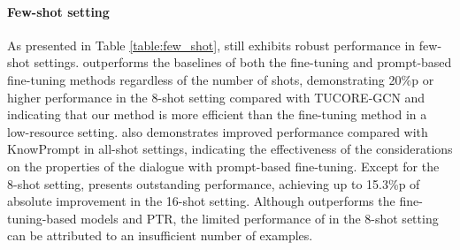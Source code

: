 \documentclass[11pt]{article}
\begin{document}
\begin{table}[t]
\centering
{}\caption{Low-resource RE performance of F1 scores (\%) on different test sets. We use K = 8, 16, 32 (\# of examples per class) for few-shot experiments. Best
results are bold and the second place results are underlined.\label{table:few_shot}}
\end{table} 
\paragraph{Few-shot setting}
As presented in Table \ref{table:few_shot},  still exhibits robust performance in few-shot settings.  outperforms the baselines of both the fine-tuning and prompt-based fine-tuning methods regardless of the number of shots, demonstrating 20\%p or higher performance in the 8-shot setting compared with TUCORE-GCN and indicating that our method is more efficient than the fine-tuning method in a low-resource setting.  also demonstrates improved performance compared with KnowPrompt in all-shot settings, indicating the effectiveness of the considerations on the properties of the dialogue with prompt-based fine-tuning. Except for the 8-shot setting,  presents outstanding performance, achieving up to 15.3\%p of absolute improvement in the 16-shot setting. 
Although  outperforms the fine-tuning-based models and PTR, the limited performance of  in the 8-shot setting can be attributed to an insufficient number of examples. 
\end{document}
